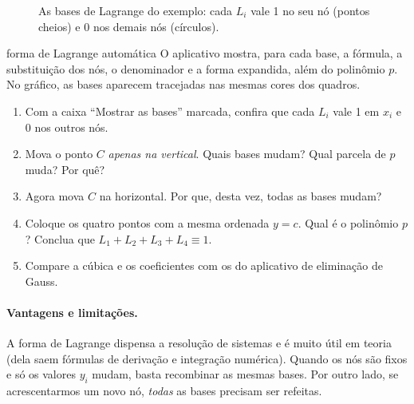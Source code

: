 \begin{figure}[h]
\centering
{}
\caption{As bases de Lagrange do exemplo: cada $L_i$ vale 1 no seu nó (pontos cheios) e 0
nos demais nós (círculos).}
\end{figure}

\begin{atividade}{forma de Lagrange automática}{\arqLagrange}
O aplicativo mostra, para cada base, a fórmula, a substituição dos nós, o denominador e a
forma expandida, além do polinômio $p$. No gráfico, as bases aparecem tracejadas nas
mesmas cores dos quadros.
\begin{enumerate}[nosep]
  \item Com a caixa ``Mostrar as bases'' marcada, confira que cada $L_i$ vale 1 em $x_i$ e 0 nos outros nós.
  \item Mova o ponto $C$ \emph{apenas na vertical}. Quais bases mudam? Qual parcela de $p$ muda? Por quê?
  \item Agora mova $C$ na horizontal. Por que, desta vez, todas as bases mudam?
  \item Coloque os quatro pontos com a mesma ordenada $y=c$. Qual é o polinômio $p$? Conclua que $L_1+L_2+L_3+L_4\equiv 1$.
  \item Compare a cúbica e os coeficientes com os do aplicativo de eliminação de Gauss.
\end{enumerate}
\end{atividade}

\paragraph{Vantagens e limitações.} A forma de Lagrange dispensa a resolução de sistemas e
é muito útil em teoria (dela saem fórmulas de derivação e integração numérica). Quando os
nós são fixos e só os valores $y_i$ mudam, basta recombinar as mesmas bases. Por outro
lado, se acrescentarmos um novo nó, \emph{todas} as bases precisam ser refeitas.

